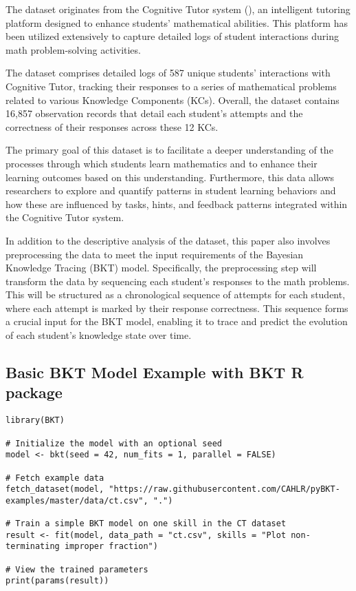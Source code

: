 \documentclass{article}
\begin{document}
The dataset originates from the Cognitive Tutor system (\cite{ritter2007cognitive}), an intelligent tutoring platform designed to enhance students' mathematical abilities. This platform has been utilized extensively to capture detailed logs of student interactions during math problem-solving activities.

The dataset comprises detailed logs of 587 unique students' interactions with Cognitive Tutor, tracking their responses to a series of mathematical problems related to various Knowledge Components (KCs). Overall, the dataset contains 16,857 observation records that detail each student's attempts and the correctness of their responses across these 12 KCs.

The primary goal of this dataset is to facilitate a deeper understanding of the processes through which students learn mathematics and to enhance their learning outcomes based on this understanding. Furthermore, this data allows researchers to explore and quantify patterns in student learning behaviors and how these are influenced by tasks, hints, and feedback patterns integrated within the Cognitive Tutor system.

In addition to the descriptive analysis of the dataset, this paper also involves preprocessing the data to meet the input requirements of the Bayesian Knowledge Tracing (BKT) model. Specifically, the preprocessing step will transform the data by sequencing each student's responses to the math problems. This will be structured as a chronological sequence of attempts for each student, where each attempt is marked by their response correctness. This sequence forms a crucial input for the BKT model, enabling it to trace and predict the evolution of each student's knowledge state over time.

\subsection{Basic BKT Model Example with BKT R package}

\begin{lstlisting}[caption={R code to train a simple BKT model}]
library(BKT)

# Initialize the model with an optional seed
model <- bkt(seed = 42, num_fits = 1, parallel = FALSE)

# Fetch example data
fetch_dataset(model, "https://raw.githubusercontent.com/CAHLR/pyBKT-examples/master/data/ct.csv", ".")

# Train a simple BKT model on one skill in the CT dataset
result <- fit(model, data_path = "ct.csv", skills = "Plot non-terminating improper fraction")

# View the trained parameters
print(params(result))
\end{lstlisting}
\end{document}

